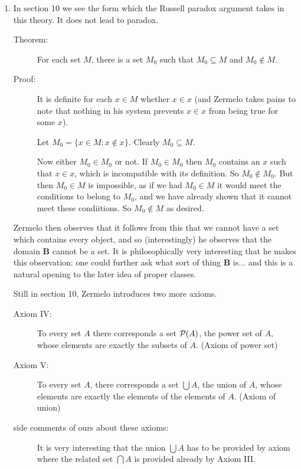 \documentclass[12pt]{article}
\begin{document}
\begin{enumerate}
\item In section 10 we see the form which the Russell paradox argument takes in this theory.  It does not lead to paradox.

\begin{description}
\item[Theorem:]  For each set $M$, there is a set $M_0$ such that $M_0 \subseteq M$ and $M_0 \not\in M$.

\item[Proof:]  It is definite for each $x \in M$ whether $x \in x$ (and Zermelo takes pains to note that nothing in his system prevents $x \in x$ from being true for some $x$).

Let $M_0 = \{x \in M:x \not\in x\}$.  Clearly $M_0 \subseteq M$.

Now either $M_0 \in M_0$ or not.  If $M_0 \in M_0$ then $M_0$ contains an $x$ such that $x \in x$, which is incompatible with its definition.  So $M_0 \not\in M_0$.
But then $M_0 \in M$ is impossible, as if we had $M_0 \in M$ it would meet the conditions to belong to $M_0$, and we have already shown that it cannot meet these condiitions.
So $M_0 \not\in M$ as desired.

\end{description}

Zermelo then observes that it follows from this that we cannot have a set which contains every object, and so (interestingly) he observes that the domain {\bf B} cannot be a set.  It is philosophically very interesting that he makes this observation:  one could further ask what sort of thing {\bf B} is$\ldots$ and this is a natural opening to the later idea of proper classes.

Still in section 10, Zermelo introduces two more axioms.

\begin{description}

\item[Axiom IV:]  To every set $A$ there corresponds a set ${\cal P}(A)$, the power set of $A$, whose elements are exactly the subsets of $A$.  (Axiom of power set)

\item[Axiom V:]  To every set $A$, there corresponds a set $\bigcup A$, the union of $A$, whose elements are exactly the elements of the elements of $A$.  (Axiom of union)

\item[side comments of ours about these axioms:]  It is very interesting that the union $\bigcup A$ has to be provided by axiom where the related set $\bigcap A$ is provided already by Axiom III.


\end{description}
\end{enumerate}
\end{document}
